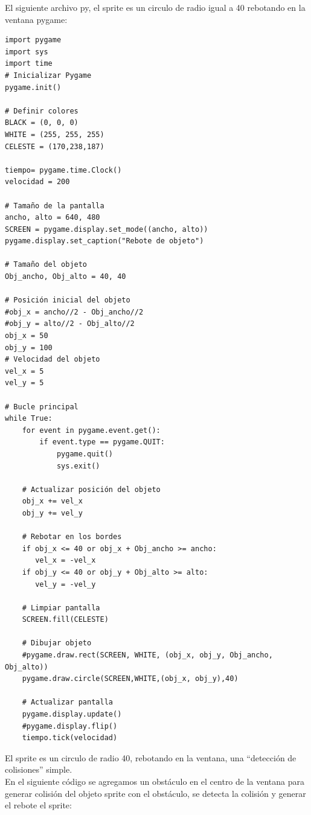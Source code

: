 {El siguiente archivo {\ttfamily py}, el sprite es un circulo de radio igual a 40 rebotando en la ventana pygame:


\hspace{-2.2cm}{\ttfamily \scriptsize rebote}

\vspace{-0.2cm}
\hspace{-2.4cm}{\ttfamily \scriptsize \_objeto.py}\vspace{-0.84cm}
\begin{lstlisting}
import pygame
import sys
import time
# Inicializar Pygame
pygame.init()

# Definir colores
BLACK = (0, 0, 0)
WHITE = (255, 255, 255)
CELESTE = (170,238,187)

tiempo= pygame.time.Clock()
velocidad = 200

# Tamaño de la pantalla
ancho, alto = 640, 480
SCREEN = pygame.display.set_mode((ancho, alto))
pygame.display.set_caption("Rebote de objeto")

# Tamaño del objeto
Obj_ancho, Obj_alto = 40, 40

# Posición inicial del objeto
#obj_x = ancho//2 - Obj_ancho//2
#obj_y = alto//2 - Obj_alto//2
obj_x = 50
obj_y = 100
# Velocidad del objeto
vel_x = 5
vel_y = 5

# Bucle principal
while True:
    for event in pygame.event.get():
        if event.type == pygame.QUIT:
            pygame.quit()
            sys.exit()

    # Actualizar posición del objeto
    obj_x += vel_x
    obj_y += vel_y

    # Rebotar en los bordes
    if obj_x <= 40 or obj_x + Obj_ancho >= ancho:
       vel_x = -vel_x
    if obj_y <= 40 or obj_y + Obj_alto >= alto:
       vel_y = -vel_y

    # Limpiar pantalla
    SCREEN.fill(CELESTE)

    # Dibujar objeto
    #pygame.draw.rect(SCREEN, WHITE, (obj_x, obj_y, Obj_ancho, Obj_alto))
    pygame.draw.circle(SCREEN,WHITE,(obj_x, obj_y),40)

    # Actualizar pantalla
    pygame.display.update()
    #pygame.display.flip()
    tiempo.tick(velocidad)
\end{lstlisting}

El sprite es un circulo de radio 40, rebotando en la ventana, una  “detección de colisiones” simple.\\

En el siguiente código se agregamos un obstáculo en el centro de la ventana para generar colisión del objeto sprite con el obstáculo, se detecta la colisión y generar el rebote el sprite: 

}
